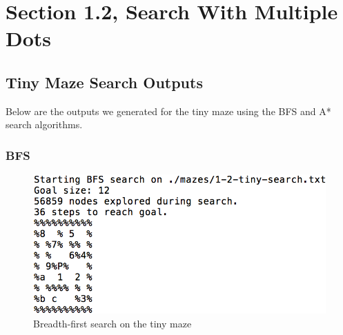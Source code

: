 \documentclass[titlepage]{article}
\begin{document}
\newpage

\section*{Section 1.2, Search With Multiple Dots} 

\subsection*{Tiny Maze Search Outputs}
Below are the outputs we generated for the tiny maze using the BFS and A* search algorithms. 


\subsubsection*{BFS}
\begin{figure}[h!]
\includegraphics[width=\linewidth]{bfstiny1-2.png}
\caption{Breadth-first search on the tiny maze}
\label{fig:BFStiny}
\end{figure}
\end{document}
